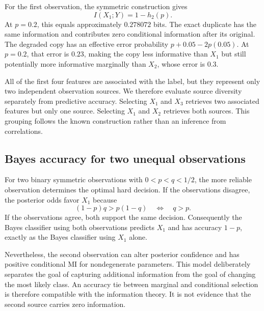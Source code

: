 \documentclass[journal,11pt]{IEEEtran}
\begin{document}
For the first observation, the symmetric construction gives
\begin{equation}
I(X_1;Y)=1-h_2(p).
\end{equation}
At $p=0.2$, this equals approximately $0.278072$ bits. The exact duplicate has the same information and contributes zero conditional information after its original. The degraded copy has an effective error probability $p+0.05-2p(0.05)$. At $p=0.2$, that error is $0.23$, making the copy less informative than $X_1$ but still potentially more informative marginally than $X_2$, whose error is $0.3$.

All of the first four features are associated with the label, but they represent only two independent observation sources. We therefore evaluate source diversity separately from predictive accuracy. Selecting $X_1$ and $X_3$ retrieves two associated features but only one source. Selecting $X_1$ and $X_2$ retrieves both sources. This grouping follows the known construction rather than an inference from correlations.

\subsection{Bayes accuracy for two unequal observations}
For two binary symmetric observations with $0<p<q<1/2$, the more reliable observation determines the optimal hard decision. If the observations disagree, the posterior odds favor $X_1$ because
\begin{equation}
(1-p)q>p(1-q)\quad\Longleftrightarrow\quad q>p.
\end{equation}
If the observations agree, both support the same decision. Consequently the Bayes classifier using both observations predicts $X_1$ and has accuracy $1-p$, exactly as the Bayes classifier using $X_1$ alone.

Nevertheless, the second observation can alter posterior confidence and has positive conditional MI for nondegenerate parameters. This model deliberately separates the goal of capturing additional information from the goal of changing the most likely class. An accuracy tie between marginal and conditional selection is therefore compatible with the information theory. It is not evidence that the second source carries zero information.
\end{document}
